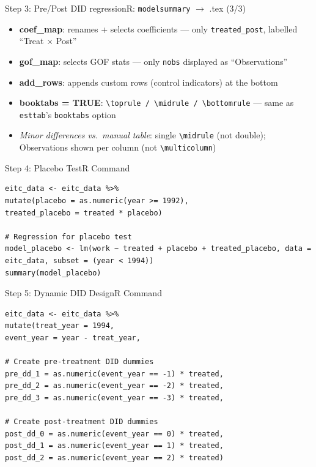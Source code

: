 \documentclass[dvipsnames,hyperref={pdfpagelabels=false}]{beamer}
\begin{document}
\begin{frame}{Step 3: Pre/Post DID regression}{R: \texttt{modelsummary} $\to$ .tex (3/3)}
\begin{itemize}
    \item \textbf{coef\_map}: renames + selects coefficients ---
          only \texttt{treated\_post}, labelled ``Treat $\times$ Post''
    \vspace{0.2cm}
    \item \textbf{gof\_map}: selects GOF stats ---
          only \texttt{nobs} displayed as ``Observations''
    \vspace{0.2cm}
    \item \textbf{add\_rows}: appends custom rows (control indicators) at the bottom
    \vspace{0.2cm}
    \item \textbf{booktabs = TRUE}: \texttt{\textbackslash toprule / \textbackslash midrule / \textbackslash bottomrule}
          --- same as \texttt{esttab}'s \texttt{booktabs} option
    \vspace{0.2cm}
    \item \textit{Minor differences vs.\ manual table}: single \texttt{\textbackslash midrule}
          (not double); Observations shown per column (not \texttt{\textbackslash multicolumn})
\end{itemize}
\end{frame}







\begin{frame}[fragile]{Step 4: Placebo Test}{R Command}
\begin{lstlisting}
eitc_data <- eitc_data %>%
mutate(placebo = as.numeric(year >= 1992),
treated_placebo = treated * placebo)

# Regression for placebo test
model_placebo <- lm(work ~ treated + placebo + treated_placebo, data = eitc_data, subset = (year < 1994))
summary(model_placebo)
\end{lstlisting}
\end{frame}




\begin{frame}[fragile]{Step 5: Dynamic DID Design}{R Command}
\begin{lstlisting}	
eitc_data <- eitc_data %>%
mutate(treat_year = 1994,
event_year = year - treat_year,

# Create pre-treatment DID dummies
pre_dd_1 = as.numeric(event_year == -1) * treated,
pre_dd_2 = as.numeric(event_year == -2) * treated,
pre_dd_3 = as.numeric(event_year == -3) * treated,

# Create post-treatment DID dummies
post_dd_0 = as.numeric(event_year == 0) * treated,
post_dd_1 = as.numeric(event_year == 1) * treated,
post_dd_2 = as.numeric(event_year == 2) * treated)
\end{lstlisting}
\end{frame}
\end{document}
